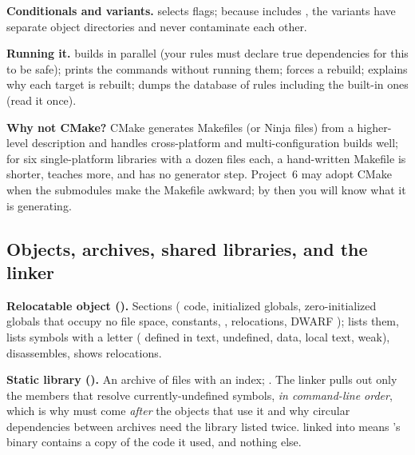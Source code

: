 \textbf{Conditionals and variants.}  selects flags; because  includes , the variants have separate object directories and never contaminate each other.

\textbf{Running it.}  builds in parallel (your rules must declare true dependencies for this to be safe);  prints the commands without running them;  forces a rebuild;  explains why each target is rebuilt;  dumps the database of rules including the built-in ones (read it once).

\textbf{Why not CMake?} CMake generates Makefiles (or Ninja files) from a higher-level description and handles cross-platform and multi-configuration builds well; for six single-platform libraries with a dozen files each, a hand-written Makefile is shorter, teaches more, and has no generator step. Project~6 may adopt CMake when the submodules make the Makefile awkward; by then you will know what it is generating.

\subsection{Objects, archives, shared libraries, and the linker}

\textbf{Relocatable object ().} Sections ( code,  initialized globals,  zero-initialized globals that occupy no file space,  constants, ,  relocations, DWARF );  lists them,  lists symbols with a letter ( defined in text,  undefined,  data,  local text,  weak),  disassembles,  shows relocations.

\textbf{Static library ().} An  archive of  files with an index; . The linker pulls out only the members that resolve currently-undefined symbols, \emph{in command-line order}, which is why  must come \emph{after} the objects that use it and why circular dependencies between archives need the library listed twice.  linked into  means 's binary contains a copy of the code it used, and nothing else.

